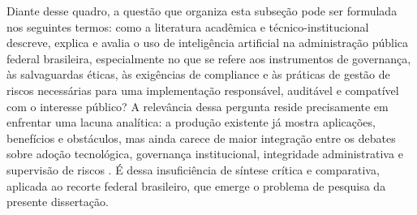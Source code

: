 \documentclass[12pt,a4paper]{article}
\begin{document}
Diante desse quadro, a questão que organiza esta subseção pode ser formulada nos seguintes termos: como a literatura acadêmica e técnico-institucional descreve, explica e avalia o uso de inteligência artificial na administração pública federal brasileira, especialmente no que se refere aos instrumentos de governança, às salvaguardas éticas, às exigências de compliance e às práticas de gestão de riscos necessárias para uma implementação responsável, auditável e compatível com o interesse público? A relevância dessa pergunta reside precisamente em enfrentar uma lacuna analítica: a produção existente já mostra aplicações, benefícios e obstáculos, mas ainda carece de maior integração entre os debates sobre adoção tecnológica, governança institucional, integridade administrativa e supervisão de riscos \autocite{pi2021machine} \autocite{sigfrids2022how} \autocite{mkander2023auditing}. É dessa insuficiência de síntese crítica e comparativa, aplicada ao recorte federal brasileiro, que emerge o problema de pesquisa da presente dissertação.
\end{document}

